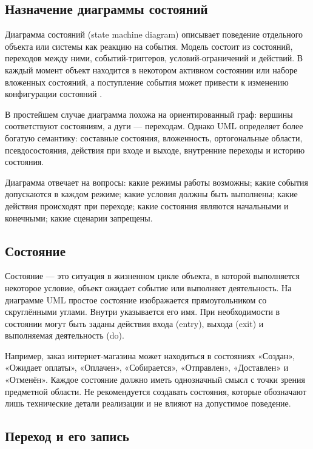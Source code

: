 \documentclass[essay,paper]{pmk-graduate}
\begin{document}
\subsection{Назначение диаграммы состояний}

Диаграмма состояний (state machine diagram) описывает поведение отдельного объекта или системы как реакцию на события. Модель состоит из состояний, переходов между ними, событий-триггеров, условий-ограничений и действий. В каждый момент объект находится в некотором активном состоянии или наборе вложенных состояний, а поступление события может привести к изменению конфигурации состояний \cite{omguml}.

В простейшем случае диаграмма похожа на ориентированный граф: вершины соответствуют состояниям, а дуги — переходам. Однако UML определяет более богатую семантику: составные состояния, вложенность, ортогональные области, псевдосостояния, действия при входе и выходе, внутренние переходы и историю состояния.

Диаграмма отвечает на вопросы: какие режимы работы возможны; какие события допускаются в каждом режиме; какие условия должны быть выполнены; какие действия происходят при переходе; какие состояния являются начальными и конечными; какие сценарии запрещены.

\subsection{Состояние}

Состояние — это ситуация в жизненном цикле объекта, в которой выполняется некоторое условие, объект ожидает событие или выполняет деятельность. На диаграмме UML простое состояние изображается прямоугольником со скруглёнными углами. Внутри указывается его имя. При необходимости в состоянии могут быть заданы действия входа (entry), выхода (exit) и выполняемая деятельность (do).

Например, заказ интернет-магазина может находиться в состояниях «Создан», «Ожидает оплаты», «Оплачен», «Собирается», «Отправлен», «Доставлен» и «Отменён». Каждое состояние должно иметь однозначный смысл с точки зрения предметной области. Не рекомендуется создавать состояния, которые обозначают лишь технические детали реализации и не влияют на допустимое поведение.

\subsection{Переход и его запись}
\end{document}
